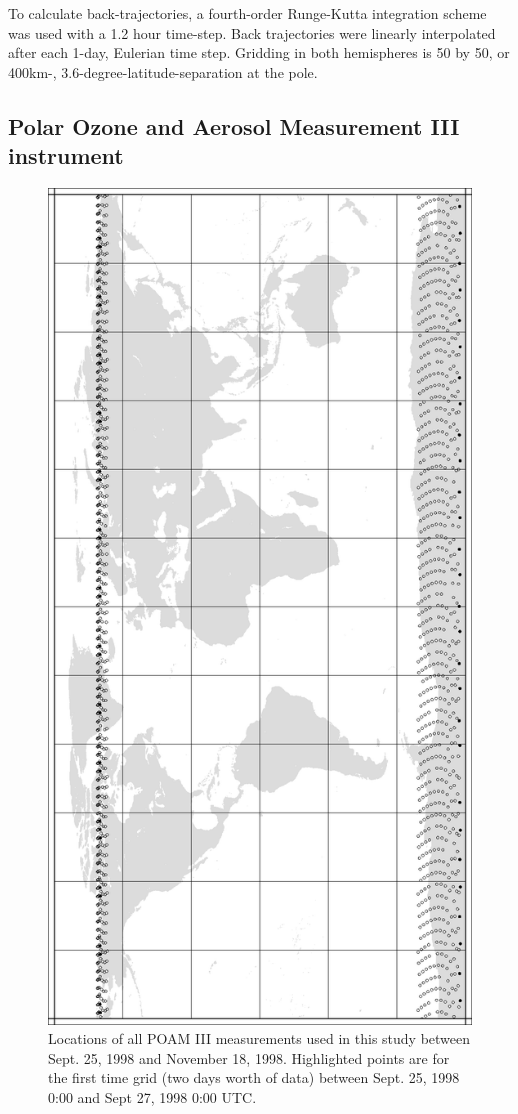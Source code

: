 To calculate back-trajectories, a fourth-order Runge-Kutta integration scheme
was used with a 1.2 hour time-step.
Back trajectories were linearly interpolated after each 1-day, Eulerian time step.
Gridding in both hemispheres is 50 by 50, or 400km-,
3.6-degree-latitude-separation at the pole.

\subsection{Polar Ozone and Aerosol Measurement III instrument}

\begin{figure}
    \includegraphics[angle=-90,width=0.9\linewidth]{POAM_loc.eps}
    \caption{Locations of all POAM III measurements used in this study 
    between Sept. 25, 1998 and November 18, 1998. 
    Highlighted points are for the first time grid (two days worth of data) between Sept. 25, 1998 0:00 and Sept 27, 1998 0:00 UTC.}
    \label{POAM_loc}
\end{figure}

